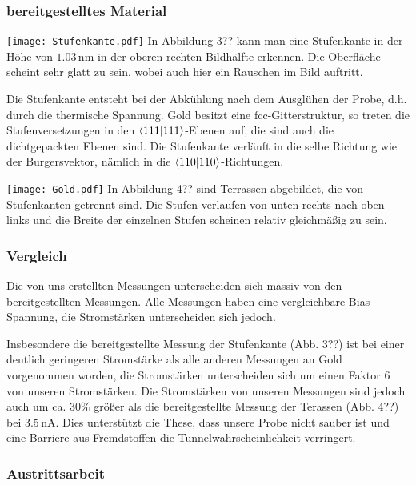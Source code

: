\documentclass[12pt,a4paper]{scrartcl}
\numberwithin{equation}{section} %
\renewcommand{\[}{} %
\renewcommand{\]}{\noindent} %
\begin{document}
\hypertarget{bereitgestelltes-material}{%
\subsubsection{bereitgestelltes
Material}\label{bereitgestelltes-material}}

\texttt{[image: Stufenkante.pdf]} In Abbildung 3?? kann man eine
Stufenkante in der Höhe von \(1.03\mathrm{\,nm}\) in der oberen rechten
Bildhälfte erkennen. Die Oberfläche scheint sehr glatt zu sein, wobei
auch hier ein Rauschen im Bild auftritt.

Die Stufenkante entsteht bei der Abkühlung nach dem Ausglühen der Probe,
d.h. durch die thermische Spannung. Gold besitzt eine
\(\mathrm{fcc}\)-Gitterstruktur, so treten die Stufenversetzungen in den
\(\braket{111}\)-Ebenen auf, die sind auch die dichtgepackten Ebenen
sind. Die Stufenkante verläuft in die selbe Richtung wie der
Burgersvektor, nämlich in die \(\braket{110}\)-Richtungen.

\texttt{[image: Gold.pdf]} In Abbildung 4?? sind Terrassen abgebildet,
die von Stufenkanten getrennt sind. Die Stufen verlaufen von unten
rechts nach oben links und die Breite der einzelnen Stufen scheinen
relativ gleichmäßig zu sein.

\hypertarget{vergleich}{%
\subsubsection{Vergleich}\label{vergleich}}

Die von uns erstellten Messungen unterscheiden sich massiv von den
bereitgestellten Messungen. Alle Messungen haben eine vergleichbare
Bias-Spannung, die Stromstärken unterscheiden sich jedoch.

Insbesondere die bereitgestellte Messung der Stufenkante (Abb. 3??) ist
bei einer deutlich geringeren Stromstärke als alle anderen Messungen an
Gold vorgenommen worden, die Stromstärken unterscheiden sich um einen
Faktor \(6\) von unseren Stromstärken. Die Stromstärken von unseren
Messungen sind jedoch auch um ca. \(30\%\) größer als die
bereitgestellte Messung der Terassen (Abb. 4??) bei
\(3.5 \mathrm{\,nA}\). Dies unterstützt die These, dass unsere Probe
nicht sauber ist und eine Barriere aus Fremdstoffen die
Tunnelwahrscheinlichkeit verringert.

\hypertarget{austrittsarbeit-1}{%
\subsubsection{Austrittsarbeit}\label{austrittsarbeit-1}}
\end{document}
